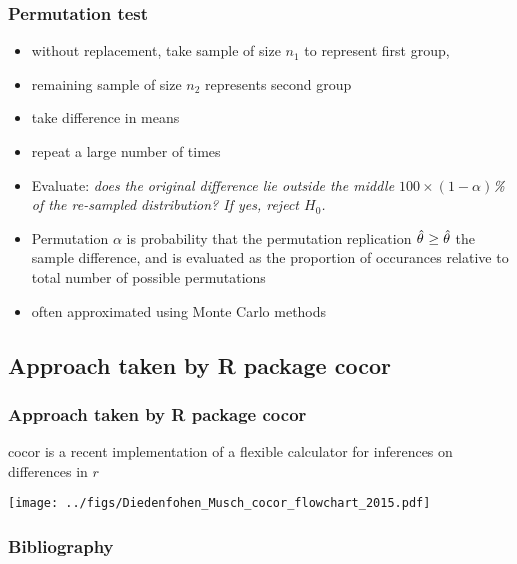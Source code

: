 \documentclass{beamer}
\begin{document}
  \begin{frame}
    \frametitle{Permutation test }  
    \begin{itemize}
  		\item without replacement, take sample of size \(n_1\) to represent first group, 
  		\item remaining sample of size \(n_2\) represents second group
	  	\item take difference in means
		  \item repeat a large number of times
		  \item Evaluate: \it{does the original difference lie outside the middle \(100\times(1-\alpha)\)\%  of the re-sampled distribution?} If yes, reject \(H_0\). 
  		\item Permutation \(\alpha\) is probability that the permutation replication \(\hat{\theta}^{\*} \geq \hat{\theta}\) the sample difference, and is evaluated as the proportion of occurances relative to total number of possible permutations
		\item often approximated using Monte Carlo methods
    \end{itemize}
  \end{frame}  

  \subsection{Approach taken by R package cocor} 
  \begin{frame}
    \frametitle{Approach taken by R package cocor}
    cocor  is a recent implementation of a flexible calculator for inferences on differences in \(r\)
    \begin{center}
      \texttt{[image: ../figs/Diedenfohen\_Musch\_cocor\_flowchart\_2015.pdf]}
    \end{center}
  \end{frame}  

  \begin{frame}[allowframebreaks]
    \frametitle{Bibliography}
    \printbibliography
  \end{frame}
  
\end{document}
